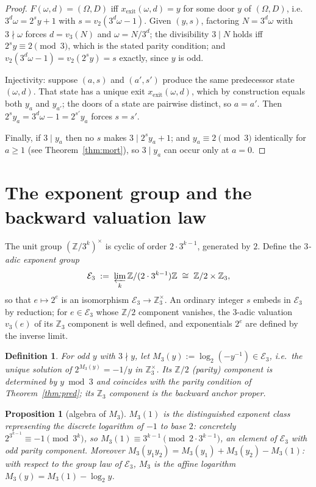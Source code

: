 \documentclass[11pt]{article}
\newtheorem{proposition}[theorem]{Proposition}
\newtheorem{definition}[theorem]{Definition}
\theoremstyle{remark}
\newcommand{\Z}{\mathbb{Z}}
\newcommand{\vt}[1]{v_2\!\left(#1\right)}
\newcommand{\vth}[1]{v_3\!\left(#1\right)}
\newcommand{\w}{\omega}
\newcommand{\E}{\mathcal{E}_3}
\begin{document}
\begin{proof}
$F(\w,d) = (\Omega,D)$ iff $x_{\mathrm{exit}}(\w,d) = y$ for some door $y$ of $(\Omega,D)$, i.e.\ $3^d\w = 2^s y + 1$ with $s = \vt{3^d\w - 1}$. Given $(y,s)$, factoring $N = 3^d \w$ with $3\nmid\w$ forces $d = \vth N$ and $\w = N/3^d$; the divisibility $3 \mid N$ holds iff $2^s y \equiv 2 \pmod 3$, which is the stated parity condition; and $\vt{3^d\w - 1} = \vt{2^s y} = s$ exactly, since $y$ is odd.

Injectivity: suppose $(a,s)$ and $(a',s')$ produce the same predecessor state $(\w,d)$. That state has a unique exit $x_{\mathrm{exit}}(\w,d)$, which by construction equals both $y_a$ and $y_{a'}$; the doors of a state are pairwise distinct, so $a = a'$. Then $2^s y_a = 3^d\w - 1 = 2^{s'} y_a$ forces $s = s'$.

Finally, if $3 \mid y_a$ then no $s$ makes $3 \mid 2^s y_a + 1$; and $y_a \equiv 2 \pmod 3$ identically for $a \ge 1$ (see Theorem~\ref{thm:mort}), so $3 \mid y_a$ can occur only at $a = 0$.
\end{proof}

\section{The exponent group and the backward valuation law}\label{sec:anchor3}

The unit group $(\Z/3^k)^\times$ is cyclic of order $2\cdot3^{k-1}$, generated by $2$. Define the \emph{$3$-adic exponent group}
\[ \E \;:=\; \varprojlim_k \Z/(2\cdot3^{k-1})\Z \;\cong\; \Z/2 \times \Z_3, \]
so that $e \mapsto 2^e$ is an isomorphism $\E \to \Z_3^\times$. An ordinary integer $s$ embeds in $\E$ by reduction; for $e \in \E$ whose $\Z/2$ component vanishes, the $3$-adic valuation $\vth{e}$ of its $\Z_3$ component is well defined, and exponentials $2^e$ are defined by the inverse limit.

\begin{definition}\label{def:m3}
For odd $y$ with $3\nmid y$, let $M_3(y) := \log_2(-y^{-1}) \in \E$, i.e.\ the unique solution of $2^{M_3(y)} = -1/y$ in $\Z_3^\times$. Its $\Z/2$ (parity) component is determined by $y \bmod 3$ and coincides with the parity condition of Theorem~\ref{thm:pred}; its $\Z_3$ component is the backward anchor proper.
\end{definition}

\begin{proposition}[algebra of $M_3$]\label{prop:alg}
$M_3(1)$ is the distinguished exponent class representing the discrete logarithm of $-1$ to base $2$: concretely $2^{3^{k-1}} \equiv -1 \pmod{3^k}$, so $M_3(1) \equiv 3^{k-1} \pmod{2\cdot3^{k-1}}$, an element of $\E$ with odd parity component. Moreover $M_3(y_1y_2) = M_3(y_1) + M_3(y_2) - M_3(1)$: with respect to the group law of $\E$, $M_3$ is the affine logarithm $M_3(y) = M_3(1) - \log_2 y$.
\end{proposition}
\end{document}
